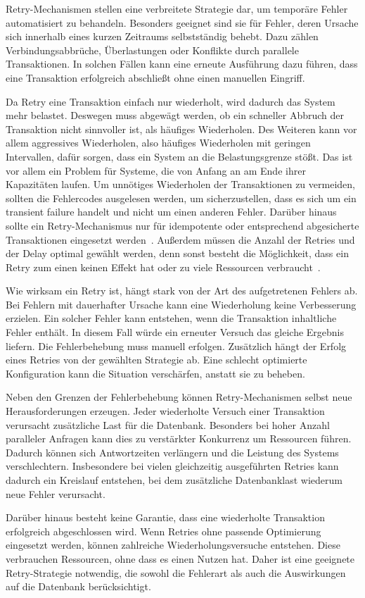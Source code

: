 
Retry-Mechanismen stellen eine verbreitete Strategie dar, um temporäre Fehler automatisiert zu behandeln.
Besonders geeignet sind sie für Fehler, deren Ursache sich innerhalb eines kurzen Zeitraums selbstständig behebt.
Dazu zählen Verbindungsabbrüche, Überlastungen oder Konflikte durch parallele Transaktionen.
In solchen Fällen kann eine erneute Ausführung dazu führen, dass eine Transaktion erfolgreich abschließt ohne
einen manuellen Eingriff.

Da Retry eine Transaktion einfach nur wiederholt, wird dadurch das System mehr belastet.
Deswegen muss abgewägt werden, ob ein schneller Abbruch der Transaktion nicht sinnvoller ist, als häufiges Wiederholen.
Des Weiteren kann vor allem aggressives Wiederholen, also häufiges Wiederholen mit geringen Intervallen, dafür
sorgen, dass ein System an die Belastungsgrenze stößt.
Das ist vor allem ein Problem für Systeme, die von Anfang an am Ende ihrer Kapazitäten laufen.
Um unnötiges Wiederholen der Transaktionen zu vermeiden, sollten die Fehlercodes ausgelesen werden, um
sicherzustellen, dass es sich um ein transient failure handelt und nicht um einen anderen Fehler.
Darüber hinaus sollte ein Retry-Mechanismus nur für idempotente oder entsprechend abgesicherte Transaktionen
eingesetzt werden~\cite{MicrosoftRetryPattern}.
Außerdem müssen die Anzahl der Retries und der Delay optimal gewählt werden, denn sonst besteht die Möglichkeit,
dass ein Retry zum einen keinen Effekt hat oder zu viele Ressourcen verbraucht~\cite{MicrosoftTransientFaults}.

Wie wirksam ein Retry ist, hängt stark von der Art des aufgetretenen Fehlers ab.
Bei Fehlern mit dauerhafter Ursache kann eine Wiederholung keine Verbesserung erzielen.
Ein solcher Fehler kann entstehen, wenn die Transaktion inhaltliche Fehler enthält.
In diesem Fall würde ein erneuter Versuch das gleiche Ergebnis liefern.
Die Fehlerbehebung muss manuell erfolgen.
Zusätzlich hängt der Erfolg eines Retries von der gewählten Strategie ab.
Eine schlecht optimierte Konfiguration kann die Situation verschärfen, anstatt sie zu beheben.

Neben den Grenzen der Fehlerbehebung können Retry-Mechanismen selbst neue Herausforderungen erzeugen.
Jeder wiederholte Versuch einer Transaktion verursacht zusätzliche Last für die Datenbank.
Besonders bei hoher Anzahl paralleler Anfragen kann dies zu verstärkter Konkurrenz um Ressourcen führen.
Dadurch können sich Antwortzeiten verlängern und die Leistung des Systems verschlechtern.
Insbesondere bei vielen gleichzeitig ausgeführten Retries kann dadurch ein Kreislauf entstehen, bei dem zusätzliche
Datenbanklast wiederum neue Fehler verursacht.

Darüber hinaus besteht keine Garantie, dass eine wiederholte Transaktion erfolgreich abgeschlossen wird.
Wenn Retries ohne passende Optimierung eingesetzt werden, können zahlreiche Wiederholungsversuche entstehen.
Diese verbrauchen Ressourcen, ohne dass es einen Nutzen hat.
Daher ist eine geeignete Retry-Strategie notwendig, die sowohl die Fehlerart als auch die Auswirkungen auf die
Datenbank berücksichtigt.